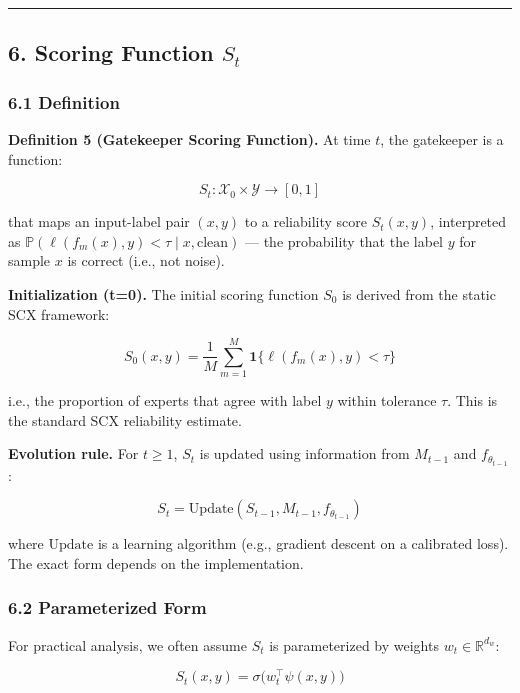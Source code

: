 \documentclass[
  12pt,
]{article}
\begin{document}
\begin{center}\rule{0.5\linewidth}{0.5pt}\end{center}

\subsection{\texorpdfstring{6. Scoring Function
\(S_t\)}{6. Scoring Function S\_t}}\label{scoring-function-s_t}

\subsubsection{6.1 Definition}\label{definition-2}

\textbf{Definition 5 (Gatekeeper Scoring Function).} At time \(t\), the
gatekeeper is a function:

\[S_t: \mathcal{X}_0 \times \mathcal{Y} \to [0,1]\]

that maps an input-label pair \((x, y)\) to a reliability score
\(S_t(x, y)\), interpreted as
\(\mathbb{P}(\ell(f_m(x), y) < \tau \mid x, \text{clean})\) --- the
probability that the label \(y\) for sample \(x\) is correct (i.e., not
noise).

\textbf{Initialization (t=0).} The initial scoring function \(S_0\) is
derived from the static SCX framework:

\[S_0(x, y) = \frac{1}{M} \sum_{m=1}^M \mathbf{1}\{\ell(f_m(x), y) < \tau\}\]

i.e., the proportion of experts that agree with label \(y\) within
tolerance \(\tau\). This is the standard SCX reliability estimate.

\textbf{Evolution rule.} For \(t \geq 1\), \(S_t\) is updated using
information from \(M_{t-1}\) and \(f_{\theta_{t-1}}\):

\[S_t = \text{Update}(S_{t-1}, M_{t-1}, f_{\theta_{t-1}})\]

where \(\text{Update}\) is a learning algorithm (e.g., gradient descent
on a calibrated loss). The exact form depends on the implementation.

\subsubsection{6.2 Parameterized Form}\label{parameterized-form}

For practical analysis, we often assume \(S_t\) is parameterized by
weights \(w_t \in \mathbb{R}^{d_w}\):

\[S_t(x, y) = \sigma\bigl( w_t^\top \psi(x, y) \bigr)\]
\end{document}
